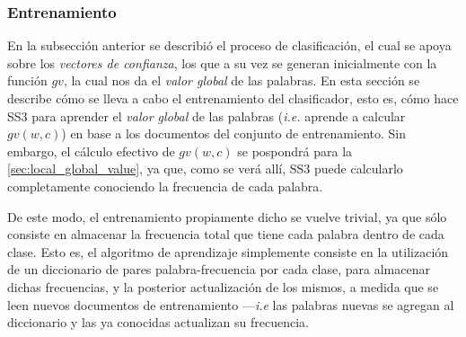 \subsubsection{Entrenamiento}
\label{sec:training_process}

En la subsección anterior se describió el proceso de clasificación, el cual se apoya sobre los \emph{vectores de confianza}, los que a su vez se generan inicialmente con la función $gv$, la cual nos da el \emph{valor global} de las palabras.
En esta sección se describe cómo se lleva a cabo el entrenamiento del clasificador, esto es, cómo hace SS3 para aprender el \emph{valor global} de las palabras (\emph{i.e.} aprende a calcular $gv(w,c)$) en base a los documentos del conjunto de entrenamiento.
Sin embargo, el cálculo efectivo de $gv(w,c)$ se pospondrá para la \autoref{sec:local_global_value}, ya que, como se verá allí, SS3 puede calcularlo completamente conociendo la frecuencia de cada palabra.

De este modo, el entrenamiento propiamente dicho se vuelve trivial, ya que sólo consiste en almacenar la frecuencia total que tiene cada palabra dentro de cada clase.
Esto es, el algoritmo de aprendizaje simplemente consiste en la utilización de un diccionario de pares palabra-frecuencia por cada clase, para almacenar dichas frecuencias, y la posterior actualización de los mismos, a medida que se leen nuevos documentos de entrenamiento ---\emph{i.e} las palabras nuevas se agregan al diccionario y las ya conocidas actualizan su frecuencia.

\vspace{5mm}

